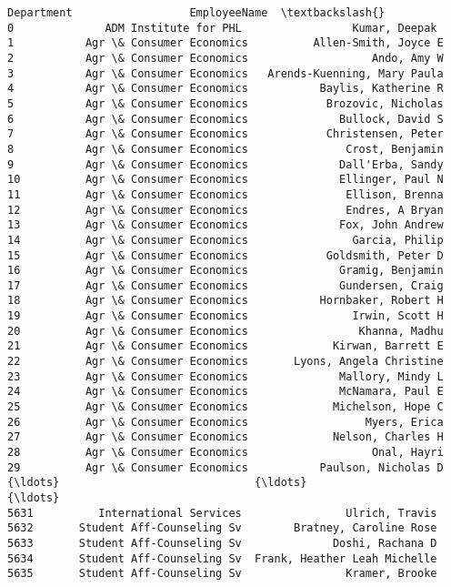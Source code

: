 \documentclass[11pt]{article}
\begin{document}
\begin{Verbatim}[commandchars=\\\{\}]
                          Department                  EmployeeName  \textbackslash{}
0              ADM Institute for PHL                 Kumar, Deepak   
1           Agr \& Consumer Economics          Allen-Smith, Joyce E   
2           Agr \& Consumer Economics                   Ando, Amy W   
3           Agr \& Consumer Economics   Arends-Kuenning, Mary Paula   
4           Agr \& Consumer Economics           Baylis, Katherine R   
5           Agr \& Consumer Economics            Brozovic, Nicholas   
6           Agr \& Consumer Economics              Bullock, David S   
7           Agr \& Consumer Economics            Christensen, Peter   
8           Agr \& Consumer Economics               Crost, Benjamin   
9           Agr \& Consumer Economics              Dall'Erba, Sandy   
10          Agr \& Consumer Economics              Ellinger, Paul N   
11          Agr \& Consumer Economics               Ellison, Brenna   
12          Agr \& Consumer Economics               Endres, A Bryan   
13          Agr \& Consumer Economics              Fox, John Andrew   
14          Agr \& Consumer Economics                Garcia, Philip   
15          Agr \& Consumer Economics            Goldsmith, Peter D   
16          Agr \& Consumer Economics              Gramig, Benjamin   
17          Agr \& Consumer Economics              Gundersen, Craig   
18          Agr \& Consumer Economics           Hornbaker, Robert H   
19          Agr \& Consumer Economics                Irwin, Scott H   
20          Agr \& Consumer Economics                 Khanna, Madhu   
21          Agr \& Consumer Economics             Kirwan, Barrett E   
22          Agr \& Consumer Economics       Lyons, Angela Christine   
23          Agr \& Consumer Economics              Mallory, Mindy L   
24          Agr \& Consumer Economics              McNamara, Paul E   
25          Agr \& Consumer Economics             Michelson, Hope C   
26          Agr \& Consumer Economics                  Myers, Erica   
27          Agr \& Consumer Economics             Nelson, Charles H   
28          Agr \& Consumer Economics                   Onal, Hayri   
29          Agr \& Consumer Economics           Paulson, Nicholas D   
{\ldots}                              {\ldots}                           {\ldots}   
5631          International Services                Ulrich, Travis   
5632       Student Aff-Counseling Sv        Bratney, Caroline Rose   
5633       Student Aff-Counseling Sv              Doshi, Rachana D   
5634       Student Aff-Counseling Sv  Frank, Heather Leah Michelle   
5635       Student Aff-Counseling Sv                Kramer, Brooke   

\end{Verbatim}
\end{document}
